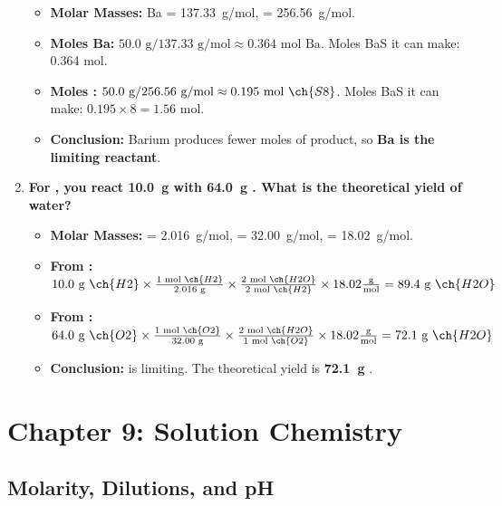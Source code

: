 \documentclass{article}
\begin{document}
\begin{enumerate}[itemsep=5pt]
     \begin{itemize}
        \item \textbf{Molar Masses:} Ba = \SI{137.33}{g/mol},  = \SI{256.56}{g/mol}.
        \item \textbf{Moles Ba:} \( 50.0 \text{ g} / 137.33 \text{ g/mol} \approx 0.364 \text{ mol Ba} \). Moles BaS it can make: 0.364 mol.
        \item \textbf{Moles :} \( 50.0 \text{ g} / 256.56 \text{ g/mol} \approx 0.195 \text{ mol } \ch{S8} \). Moles BaS it can make: \( 0.195 \times 8 = 1.56 \text{ mol}\).
        \item \textbf{Conclusion:} Barium produces fewer moles of product, so \textbf{Ba is the limiting reactant}.
    \end{itemize}
    \item \textbf{For , you react \SI{10.0}{g}  with \SI{64.0}{g} . What is the theoretical yield of water?}
    \begin{itemize}
        \item \textbf{Molar Masses:}  = \SI{2.016}{g/mol},  = \SI{32.00}{g/mol},  = \SI{18.02}{g/mol}.
        \item \textbf{From :} \( 10.0 \text{ g } \ch{H2} \times \frac{1 \text{ mol } \ch{H2}}{2.016 \text{ g}} \times \frac{2 \text{ mol } \ch{H2O}}{2 \text{ mol } \ch{H2}} \times 18.02 \frac{\text{g}}{\text{mol}} = 89.4 \text{ g } \ch{H2O} \)
        \item \textbf{From :} \( 64.0 \text{ g } \ch{O2} \times \frac{1 \text{ mol } \ch{O2}}{32.00 \text{ g}} \times \frac{2 \text{ mol } \ch{H2O}}{1 \text{ mol } \ch{O2}} \times 18.02 \frac{\text{g}}{\text{mol}} = 72.1 \text{ g } \ch{H2O} \)
        \item \textbf{Conclusion:}  is limiting. The theoretical yield is \textbf{\SI{72.1}{g} }.
    \end{itemize}
\end{enumerate}

\section*{Chapter 9: Solution Chemistry}

\subsection*{Molarity, Dilutions, and pH}
\end{document}
